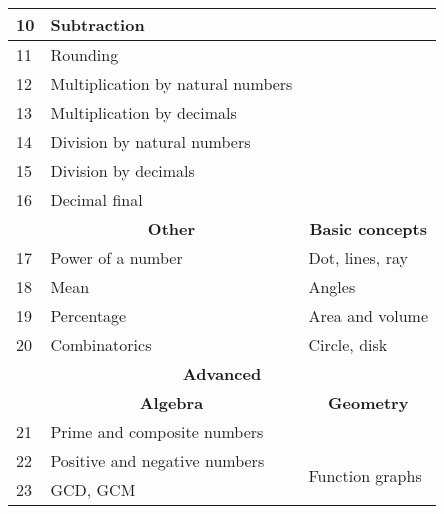\documentclass[a4paper]{article}
\begin{document}
\begin{center}
\begin{table}[]
\begin{tabular}{|lll|}
\multicolumn{1}{|l|}{10} & \multicolumn{1}{l|}{Subtraction}                       &                                              \\ \hline
\multicolumn{1}{|l|}{11} & \multicolumn{1}{l|}{Rounding}                          &                                              \\ \hline
\multicolumn{1}{|l|}{12} & \multicolumn{1}{l|}{Multiplication by natural numbers} &                                              \\ \hline
\multicolumn{1}{|l|}{13} & \multicolumn{1}{l|}{Multiplication by decimals}        &                                              \\ \hline
\multicolumn{1}{|l|}{14} & \multicolumn{1}{l|}{Division by natural numbers}       &                                              \\ \hline
\multicolumn{1}{|l|}{15} & \multicolumn{1}{l|}{Division by decimals}              &                                              \\ \hline
\multicolumn{1}{|l|}{16} & \multicolumn{1}{l|}{Decimal final}                     &                                              \\ \hline
\multicolumn{1}{|l|}{}   & \multicolumn{1}{c|}{\textbf{Other}}                    & \multicolumn{1}{c|}{\textbf{Basic concepts}} \\ \hline
\multicolumn{1}{|l|}{17} & \multicolumn{1}{l|}{Power of a number}                 & Dot, lines, ray                              \\ \hline
\multicolumn{1}{|l|}{18} & \multicolumn{1}{l|}{Mean}                              & Angles                                       \\ \hline
\multicolumn{1}{|l|}{19} & \multicolumn{1}{l|}{Percentage}                        & Area and volume                              \\ \hline
\multicolumn{1}{|l|}{20} & \multicolumn{1}{l|}{Combinatorics}                     & Circle, disk                                 \\ \hline
\multicolumn{3}{|c|}{\textbf{Advanced}}                                                                                          \\ \hline
\multicolumn{1}{|l|}{}   & \multicolumn{1}{c|}{\textbf{Algebra}}                  & \multicolumn{1}{c|}{\textbf{Geometry}}       \\ \hline
\multicolumn{1}{|l|}{21} & \multicolumn{1}{l|}{Prime and composite numbers}       &                                              \\ \hline
\multicolumn{1}{|l|}{22} & \multicolumn{1}{l|}{Positive and negative numbers}     & \multirow{2}{*}{Function graphs}             \\ \cline{1-2}
\multicolumn{1}{|l|}{23} & \multicolumn{1}{l|}{GCD, GCM}                          &                                              \\ \hline
\end{tabular}
\end{table}
\end{center}
\end{document}
